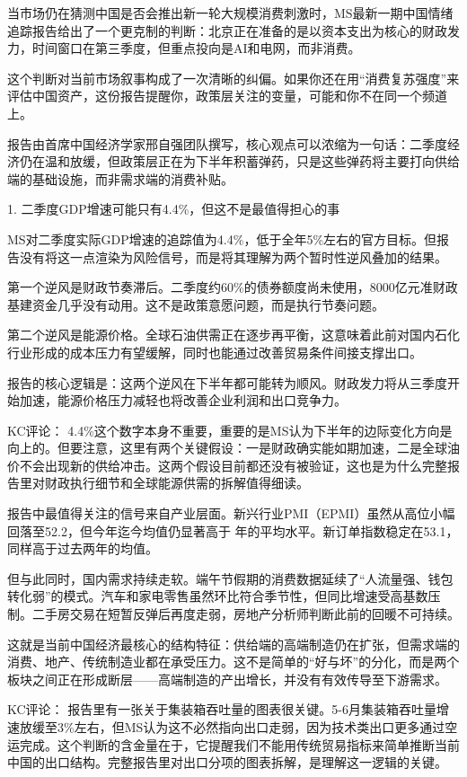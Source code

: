 \documentclass[11pt]{ctexart}
\begin{document}
当市场仍在猜测中国是否会推出新一轮大规模消费刺激时，MS最新一期中国情绪追踪报告给出了一个更克制的判断：北京正在准备的是以资本支出为核心的财政发力，时间窗口在第三季度，但重点投向是AI和电网，而非消费。

这个判断对当前市场叙事构成了一次清晰的纠偏。如果你还在用“消费复苏强度”来评估中国资产，这份报告提醒你，政策层关注的变量，可能和你不在同一个频道上。

报告由首席中国经济学家邢自强团队撰写，核心观点可以浓缩为一句话：二季度经济仍在温和放缓，但政策层正在为下半年积蓄弹药，只是这些弹药将主要打向供给端的基础设施，而非需求端的消费补贴。

1. 二季度GDP增速可能只有4.4\%，但这不是最值得担心的事

MS对二季度实际GDP增速的追踪值为4.4\%，低于全年5\%左右的官方目标。但报告没有将这一点渲染为风险信号，而是将其理解为两个暂时性逆风叠加的结果。

第一个逆风是财政节奏滞后。二季度约60\%的债券额度尚未使用，8000亿元准财政基建资金几乎没有动用。这不是政策意愿问题，而是执行节奏问题。

第二个逆风是能源价格。全球石油供需正在逐步再平衡，这意味着此前对国内石化行业形成的成本压力有望缓解，同时也能通过改善贸易条件间接支撑出口。

报告的核心逻辑是：这两个逆风在下半年都可能转为顺风。财政发力将从三季度开始加速，能源价格压力减轻也将改善企业利润和出口竞争力。

KC评论： 4.4\%这个数字本身不重要，重要的是MS认为下半年的边际变化方向是向上的。但要注意，这里有两个关键假设：一是财政确实能如期加速，二是全球油价不会出现新的供给冲击。这两个假设目前都还没有被验证，这也是为什么完整报告里对财政执行细节和全球能源供需的拆解值得细读。

报告中最值得关注的信号来自产业层面。新兴行业PMI（EPMI）虽然从高位小幅回落至52.2，但今年迄今均值仍显著高于 年的平均水平。新订单指数稳定在53.1，同样高于过去两年的均值。

但与此同时，国内需求持续走软。端午节假期的消费数据延续了“人流量强、钱包转化弱”的模式。汽车和家电零售虽然环比符合季节性，但同比增速受高基数压制。二手房交易在短暂反弹后再度走弱，房地产分析师判断此前的回暖不可持续。

这就是当前中国经济最核心的结构特征：供给端的高端制造仍在扩张，但需求端的消费、地产、传统制造业都在承受压力。这不是简单的“好与坏”的分化，而是两个板块之间正在形成断层——高端制造的产出增长，并没有有效传导至下游需求。

KC评论： 报告里有一张关于集装箱吞吐量的图表很关键。5-6月集装箱吞吐量增速放缓至3\%左右，但MS认为这不必然指向出口走弱，因为技术类出口更多通过空运完成。这个判断的含金量在于，它提醒我们不能用传统贸易指标来简单推断当前中国的出口结构。完整报告里对出口分项的图表拆解，是理解这一逻辑的关键。
\end{document}
